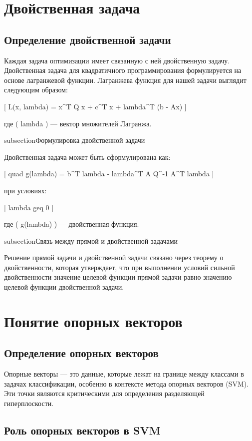 \section{Двойственная задача}

\subsection{Определение двойственной задачи}

Каждая задача оптимизации имеет связанную с ней двойственную задачу. Двойственная задача для квадратичного программирования формулируется на основе лагранжевой функции. Лагранжева функция для нашей задачи выглядит следующим образом:

[
L(x, lambda) =  x^T Q x + c^T x + lambda^T (b - Ax)
]

где ( lambda ) — вектор множителей Лагранжа.

subsection{Формулировка двойственной задачи}

Двойственная задача может быть сформулирована как:

[
 quad g(lambda) = b^T lambda -  lambda^T A Q^{-1} A^T lambda
]

при условиях:

[
lambda geq 0
]

где ( g(lambda) ) — двойственная функция.

subsection{Связь между прямой и двойственной задачами}

Решение прямой задачи и двойственной задачи связано через теорему о двойственности, которая утверждает, что при выполнении условий сильной двойственности значение целевой функции прямой задачи равно значению целевой функции двойственной задачи.

\section{Понятие опорных векторов}

\subsection{Определение опорных векторов}

Опорные векторы — это данные, которые лежат на границе между классами в задачах классификации, особенно в контексте метода опорных векторов (SVM). Эти точки являются критическими для определения разделяющей гиперплоскости.

\subsection{Роль опорных векторов в SVM}

